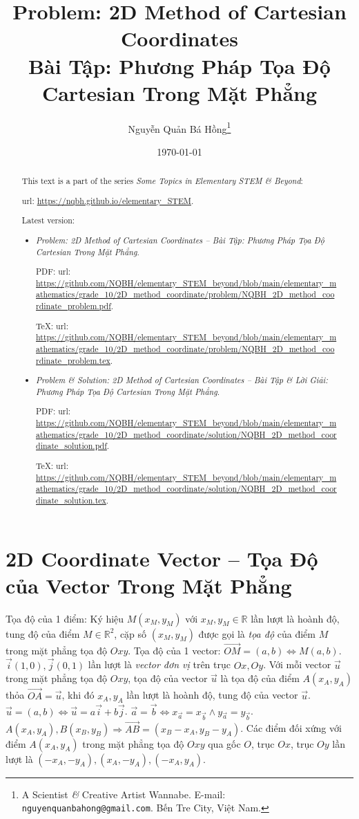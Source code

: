 \documentclass{article}
\title{Problem: 2D Method of Cartesian Coordinates\\Bài Tập: Phương Pháp Tọa Độ Cartesian Trong Mặt Phẳng}
\author{Nguyễn Quản Bá Hồng\footnote{A Scientist {\it\&} Creative Artist Wannabe. E-mail: {\tt nguyenquanbahong@gmail.com}. Bến Tre City, Việt Nam.}}
\date{\today}
\begin{document}
\maketitle
\begin{abstract}
	This text is a part of the series {\it Some Topics in Elementary STEM \& Beyond}:
	
	{\sc url}: \url{https://nqbh.github.io/elementary_STEM}.
	
	Latest version:
	\begin{itemize}
		\item {\it Problem: 2D Method of Cartesian Coordinates -- Bài Tập: Phương Pháp Tọa Độ Cartesian Trong Mặt Phẳng}.
		
		PDF: {\sc url}: \url{https://github.com/NQBH/elementary_STEM_beyond/blob/main/elementary_mathematics/grade_10/2D_method_coordinate/problem/NQBH_2D_method_coordinate_problem.pdf}.
		
		\TeX: {\sc url}: \url{https://github.com/NQBH/elementary_STEM_beyond/blob/main/elementary_mathematics/grade_10/2D_method_coordinate/problem/NQBH_2D_method_coordinate_problem.tex}.
		\item {\it Problem \& Solution: 2D Method of Cartesian Coordinates -- Bài Tập \& Lời Giải: Phương Pháp Tọa Độ Cartesian Trong Mặt Phẳng}.
		
		PDF: {\sc url}: \url{https://github.com/NQBH/elementary_STEM_beyond/blob/main/elementary_mathematics/grade_10/2D_method_coordinate/solution/NQBH_2D_method_coordinate_solution.pdf}.
		
		\TeX: {\sc url}: \url{https://github.com/NQBH/elementary_STEM_beyond/blob/main/elementary_mathematics/grade_10/2D_method_coordinate/solution/NQBH_2D_method_coordinate_solution.tex}.
	\end{itemize}
\end{abstract}
\tableofcontents


\section{2D Coordinate Vector -- Tọa Độ của Vector Trong Mặt Phẳng}
 {\sf Tọa độ của 1 điểm}: Ký hiệu $M(x_M,y_M)$ với $x_M,y_M\in\mathbb{R}$ lần lượt là hoành độ, tung độ của điểm $M\in\mathbb{R}^2$, cặp số $(x_M,y_M)$ được gọi là {\it tọa độ} của điểm $M$ trong mặt phẳng tọa độ $Oxy$.  {\sf Tọa độ của 1 vector}: $\overrightarrow{OM} = (a,b)\Leftrightarrow M(a,b)$. $\vec{i}(1,0),\vec{j}(0,1)$ lần lượt là {\it vector đơn vị} trên trục $Ox,Oy$. Với mỗi vector $\vec{u}$ trong mặt phẳng tọa độ $Oxy$, tọa độ của vector $\vec{u}$ là tọa độ của điểm $A(x_A,y_A)$ thỏa $\overrightarrow{OA} = \vec{u}$, khi đó $x_A,y_A$ lần lượt là hoành độ, tung độ của vector $\vec{u}$.  $\vec{u} = (a,b)\Leftrightarrow\vec{u} = a\vec{i} + b\vec{j}$.  $\vec{a} = \vec{b}\Leftrightarrow x_{\vec{a}} = x_{\vec{b}}\land y_{\vec{a}} = y_{\vec{b}}$.  $A(x_A,y_A),B(x_B,y_B)\Rightarrow\overrightarrow{AB} = (x_B - x_A,y_B - y_A)$.  Các điểm đối xứng với điểm $A(x_A,y_A)$ trong mặt phẳng tọa độ $Oxy$ qua gốc $O$, trục $Ox$, trục $Oy$ lần lượt là $(-x_A,-y_A),(x_A,-y_A),(-x_A,y_A)$.
\end{document}
